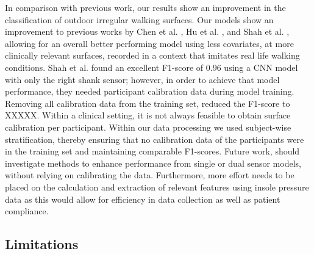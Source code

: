 \documentclass[sensors,article,submit,pdftex,moreauthors]{Definitions/mdpi}
\begin{document}
In comparison with previous work, our results show an improvement in the classification of outdoor irregular walking surfaces. 
Our models show an improvement to previous works by Chen et al. \cite{Chen2019}, Hu et al. \cite{Hu_2021}, and Shah et al. \cite{Shah_2022}, allowing for an overall better performing model using less covariates, at more clinically relevant surfaces, recorded in a context that imitates real life walking conditions. Shah et al. \cite{Shah_2022} found an excellent F1-score of 0.96 using a CNN model with only the right shank sensor; however, in order to achieve that model performance, they needed participant calibration data during model training. Removing all calibration data from the training set, reduced the F1-score to XXXXX. Within a clinical setting, it is not always feasible to obtain surface calibration per participant. Within our data processing we used subject-wise stratification, thereby ensuring that no calibration data of the participants were in the training set and maintaining comparable F1-scores. Future work, should investigate methods to enhance performance from single or dual sensor models, without relying on calibrating the data. Furthermore, more effort needs to be placed on the calculation and extraction of relevant features using insole pressure data as this would allow for efficiency in data collection as well as patient compliance.

\subsection{Limitations}
\end{document}
